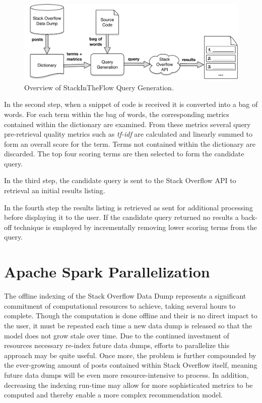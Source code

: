 \documentclass[conference]{IEEEtran}
\newcommand{\so}{Stack Overflow\xspace}
\newcommand{\sitf}{{\sc StackInTheFlow}\xspace}
\begin{document}
\begin{figure}[ht]
	\centering
	\caption{Overview of \sitf Query Generation.}
 	\label{fig:overview}
 	\includegraphics[width=.75\linewidth]{query-gen.pdf}
\end{figure}

In the second step, when a snippet of code is received it is converted into a bag of words.  For each term within the bag of words, the corresponding metrics contained within the dictionary are examined. From these metrics several query pre-retrieval quality metrics such as \textit{tf-idf} are calculated and linearly summed to form an overall score for the term. Terms not contained within the dictionary are discarded. The top four scoring terms are then selected to form the candidate query.

In the third step, the candidate query is sent to the \so API to retrieval an initial results listing.

In the fourth step the results listing is retrieved as sent for additional processing before displaying it to the user.  If the candidate query returned no results a back-off technique is employed by incrementally removing lower scoring terms from the query.

\section{Apache Spark Parallelization}
The offline indexing of the \so Data Dump represents a significant commitment of computational resources to achieve, taking several hours to complete.  Though the computation is done offline and their is no direct impact to the user, it must be repeated each time a new data dump is released so that the model does not grow stale over time.  Due to the continued investment of resources necessary re-index future data dumps, efforts to parallelize this approach may be quite useful. Once more, the problem is further compounded by the ever-growing amount of posts contained within \so itself, meaning future data dumps will be even more resource-intensive to process.  In addition, decreasing the indexing run-time may allow for more sophisticated metrics to be computed and thereby enable a more complex recommendation model.
\end{document}
